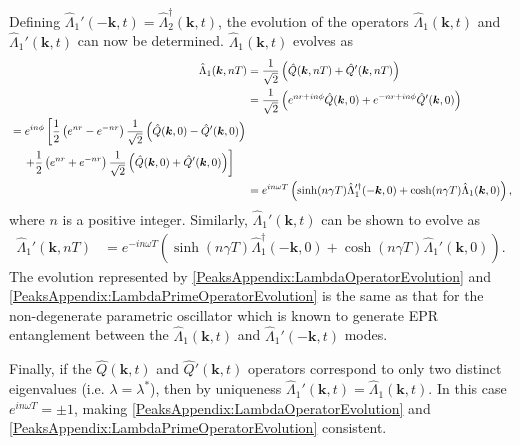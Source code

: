 Defining $\hat{\Lambda}_1'(-\bm{k}, t) = \hat{\Lambda}_2^\dagger(\bm{k}, t)$, the evolution of the operators $\hat{\Lambda}_1(\bm{k}, t)$ and $\hat{\Lambda}_1'(\bm{k}, t)$ can now be determined. $\hat{\Lambda}_1(\bm{k}, t)$ evolves as
\begin{align}
    \hat{\Lambda}_1(\bm{k}, nT) &= \frac{1}{\sqrt{2}} \left(\hat{Q}(\bm{k}, nT) + \hat{Q}'(\bm{k}, nT) \right) \\
        &= \frac{1}{\sqrt{2}} \left( e^{nr + i n\phi} \hat{Q}(\bm{k}, 0) + e^{-nr + i n \phi}\hat{Q}'(\bm{k}, 0)\right) \\
        \begin{split}
            &=  e^{i n \phi} \left[ \frac{1}{2}\left( e^{nr} - e^{-nr}\right)\frac{1}{\sqrt{2}}\left(\hat{Q}(\bm{k}, 0) - \hat{Q}'(\bm{k}, 0) \right) \right.\\
            &\relphantom{=}\left. + \frac{1}{2} \left( e^{nr} + e^{-nr}\right)\frac{1}{\sqrt{2}} \left( \hat{Q}(\bm{k}, 0) + \hat{Q}'(\bm{k}, 0)\right)\right]
        \end{split}\\
        &= e^{i n \omega T} \left( \sinh(n\gamma T) \hat{\Lambda}_1'^\dagger(-\bm{k}, 0) + \cosh(n \gamma T) \hat{\Lambda}_1(\bm{k}, 0)\right), \label{PeaksAppendix:LambdaOperatorEvolution}
\end{align}
where $n$ is a positive integer. Similarly, $\hat{\Lambda}_1'(\bm{k}, t)$ can be shown to evolve as
\begin{align}
    \hat{\Lambda}_1'(\bm{k}, nT) &= e^{-i n \omega T} \left( \sinh(n \gamma T) \hat{\Lambda}_1^\dagger(-\bm{k}, 0) + \cosh(n \gamma T) \hat{\Lambda}_1'(\bm{k}, 0)\right). \label{PeaksAppendix:LambdaPrimeOperatorEvolution}
\end{align}
The evolution represented by \eqref{PeaksAppendix:LambdaOperatorEvolution} and \eqref{PeaksAppendix:LambdaPrimeOperatorEvolution} is the same as that for the non-degenerate parametric oscillator \citep{WallsMilburn} which is known to generate EPR entanglement between the $\hat{\Lambda}_1(\bm{k}, t)$ and $\hat{\Lambda}_1'(-\bm{k}, t)$ modes.

Finally, if the $\hat{Q}(\bm{k}, t)$ and $\hat{Q}'(\bm{k}, t)$ operators correspond to only two distinct eigenvalues (i.e. $\lambda = \lambda^*$), then by uniqueness $\hat{\Lambda}_1'(\bm{k}, t) = \hat{\Lambda}_1(\bm{k}, t)$. In this case $\displaystyle e^{i n\omega T} = \pm 1$, making \eqref{PeaksAppendix:LambdaOperatorEvolution} and \eqref{PeaksAppendix:LambdaPrimeOperatorEvolution} consistent.

